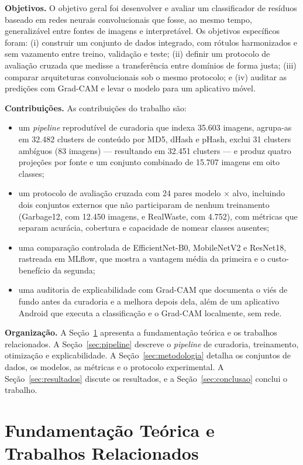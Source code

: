 \documentclass[11pt,a4paper]{article}
\begin{document}
	\textbf{Objetivos.} O objetivo geral foi desenvolver e avaliar um classificador de resíduos baseado em redes neurais convolucionais que fosse, ao mesmo tempo, generalizável entre fontes de imagens e interpretável. Os objetivos específicos foram: (i) construir um conjunto de dados integrado, com rótulos harmonizados e sem vazamento entre treino, validação e teste; (ii) definir um protocolo de avaliação cruzada que medisse a transferência entre domínios de forma justa; (iii) comparar arquiteturas convolucionais sob o mesmo protocolo; e (iv) auditar as predições com Grad-CAM e levar o modelo para um aplicativo móvel.
	
	\textbf{Contribuições.} As contribuições do trabalho são:
	\begin{itemize}
		\item um \textit{pipeline} reprodutível de curadoria que indexa 35.603 imagens, agrupa-as em 32.482 clusters de conteúdo por MD5, dHash e pHash, exclui 31 clusters ambíguos (83 imagens) --- resultando em 32.451 clusters --- e produz quatro projeções por fonte e um conjunto combinado de 15.707 imagens em oito classes;
		\item um protocolo de avaliação cruzada com 24 pares modelo $\times$ alvo, incluindo dois conjuntos externos que não participaram de nenhum treinamento (Garbage12, com 12.450 imagens, e RealWaste, com 4.752), com métricas que separam acurácia, cobertura e capacidade de nomear classes ausentes;
		\item uma comparação controlada de EfficientNet-B0, MobileNetV2 e ResNet18, rastreada em MLflow, que mostra a vantagem média da primeira e o custo-benefício da segunda;
		\item uma auditoria de explicabilidade com Grad-CAM que documenta o viés de fundo antes da curadoria e a melhora depois dela, além de um aplicativo Android que executa a classificação e o Grad-CAM localmente, sem rede.
	\end{itemize}
	
	\textbf{Organização.} A Seção~\ref{sec:background} apresenta a fundamentação teórica e os trabalhos relacionados. A Seção~\ref{sec:pipeline} descreve o \textit{pipeline} de curadoria, treinamento, otimização e explicabilidade. A Seção~\ref{sec:metodologia} detalha os conjuntos de dados, os modelos, as métricas e o protocolo experimental. A Seção~\ref{sec:resultados} discute os resultados, e a Seção~\ref{sec:conclusao} conclui o trabalho.
	
	\section{Fundamentação Teórica e Trabalhos Relacionados}
	\label{sec:background}
	
\end{document}
